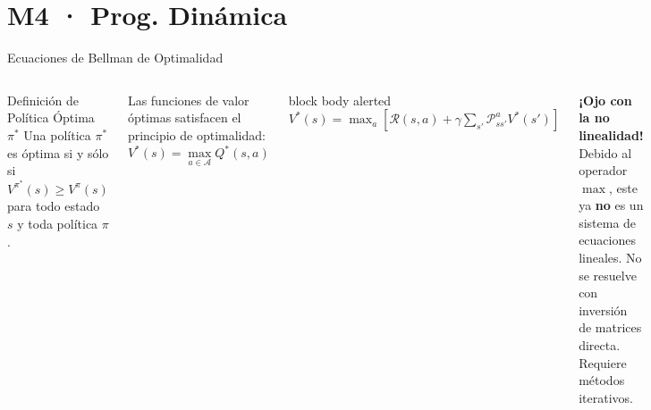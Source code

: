 \section{M4 · Prog. Dinámica}

\begin{frame}{Ecuaciones de Bellman de Optimalidad}
  \begin{columns}[c,onlytextwidth]
      \begin{block}{Definición de Política Óptima $\pi^*$}
        Una política $\pi^*$ es óptima si y sólo si $V^{\pi^*}(s) \ge V^\pi(s)$ para todo estado $s$ y toda política $\pi$.
      \end{block}
      \vspace{0.2cm}
      Las funciones de valor óptimas satisfacen el principio de optimalidad:
      \[
        V^*(s) = \max_{a \in \mathcal{A}} Q^*(s,a)
      \]
      \begin{beamercolorbox}[rounded=true,sep=0.8em]{block body alerted}
        \centering
        {\large $V^*(s) = \displaystyle\max_{a} \left[ \mathcal{R}(s,a) + \gamma \sum_{s'} \mathcal{P}_{ss'}^a V^*(s') \right]$}
      \end{beamercolorbox}
      \vspace{0.25cm}
      \small \textbf{¡Ojo con la no linealidad!}\\
      Debido al operador $\max$, este ya \textbf{no} es un sistema de ecuaciones lineales. No se resuelve con inversión de matrices directa. Requiere métodos iterativos.
  \end{columns}
\end{frame}

